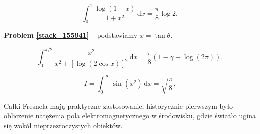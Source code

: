 
\begin{problem_with_solution}[pytanie 155941]
    \label{stack_155941}%
    \begin{equation}
        \int_0^1 \frac{\log (1+x)}{1 + x^2} \,\mathrm{d}x = \frac \pi 8  \log 2.
    \end{equation}
\end{problem_with_solution}

\textbf{Problem \ref{stack_155941}} -- podstawiamy $x = \tan \theta$.


\begin{problem}[pytanie 178790]
    \label{stack_178790}%
    \begin{equation}
        \int_0^{\pi/2} \frac{x^2}{x^2 + [\log (2 \cos x)]^2} \,\mathrm{d}x = \frac{\pi}{8} (1 - \gamma + \log (2 \pi)).
    \end{equation}
\end{problem}


\begin{problem_with_solution}
    \label{stack_187729}%
    \begin{equation}
        I = \int_0^\infty \sin (x^2) \,\mathrm{d} x = \sqrt{\frac \pi 8}.
    \end{equation}
\end{problem_with_solution}

Całki Fresnela mają praktyczne zastosowanie, historycznie pierwszym było obliczenie natężenia pola elektromagnetycznego w środowisku, gdzie światło ugina się wokół nieprzezroczystych obiektów.
%

